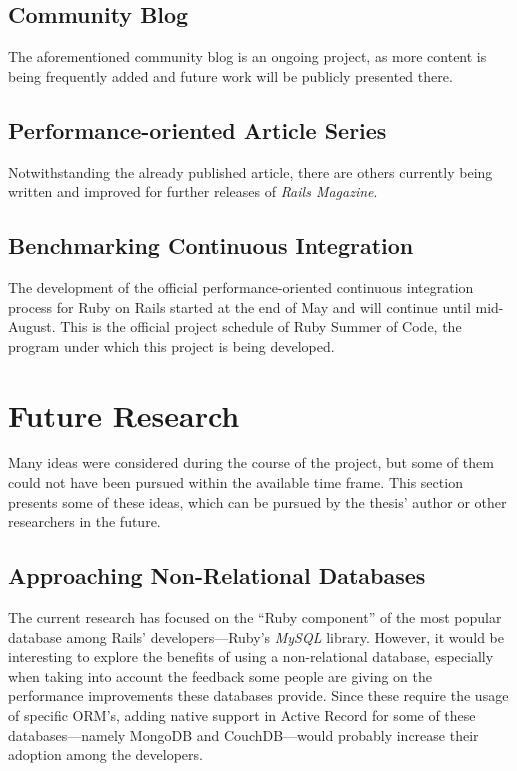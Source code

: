 \subsection{Community Blog}
The aforementioned community blog is an ongoing project, as more content is being frequently added and future work will be publicly presented there.

\subsection{Performance-oriented Article Series}
Notwithstanding the already published article, there are others currently being written and improved for further releases of \textit{Rails Magazine}.

\subsection{Benchmarking Continuous Integration}
The development of the official performance-oriented continuous integration process for Ruby on Rails started at the end of May and will continue until mid-August. This is the official project schedule of Ruby Summer of Code, the program under which this project is being developed.


\section{Future Research}
Many ideas were considered during the course of the project, but some of them could not have been pursued within the available time frame. This section presents some of these ideas, which can be pursued by the thesis' author or other researchers in the future.

\subsection{Approaching Non-Relational Databases}
The current research has focused on the ``Ruby component'' of the most popular database among Rails' developers---Ruby's \textit{MySQL} library. However, it would be interesting to explore the benefits of using a non-relational database, especially when taking into account the feedback some people are giving on the performance improvements these databases provide. Since these require the usage of specific ORM's, adding native support in Active Record for some of these databases---namely MongoDB and CouchDB---would probably increase their adoption among the developers.

